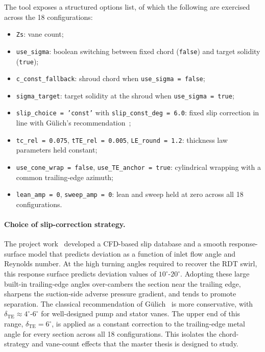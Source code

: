 The tool exposes a structured options list, of which the following are exercised across the 18 configurations:
\begin{itemize}
  \item \texttt{Zs}: vane count;
  \item \texttt{use\_sigma}: boolean switching between fixed chord (\texttt{false}) and target solidity (\texttt{true});
  \item \texttt{c\_const\_fallback}: shroud chord when \texttt{use\_sigma = false};
  \item \texttt{sigma\_target}: target solidity at the shroud when \texttt{use\_sigma = true};
  \item \texttt{slip\_choice = 'const'} with \texttt{slip\_const\_deg = 6.0}: fixed slip correction in line with G\"ulich's recommendation~\cite{Gulich2010};
  \item \texttt{tc\_rel = 0.075}, \texttt{tTE\_rel = 0.005}, \texttt{LE\_round = 1.2}: thickness law parameters held constant;
  \item \texttt{use\_cone\_wrap = false}, \texttt{use\_TE\_anchor = true}: cylindrical wrapping with a common trailing-edge azimuth;
  \item \texttt{lean\_amp = 0}, \texttt{sweep\_amp = 0}: lean and sweep held at zero across all 18 configurations.
\end{itemize}
 
\paragraph{Choice of slip-correction strategy.}
The project work~\cite{Leonsen2025} developed a CFD-based slip database and a smooth response-surface model that predicts deviation as a function of inlet flow angle and Reynolds number. At the high turning angles required to recover the RDT swirl, this response surface predicts deviation values of $10^\circ$-$20^\circ$. Adopting these large built-in trailing-edge angles over-cambers the section near the trailing edge, sharpens the suction-side adverse pressure gradient, and tends to promote separation. The classical recommendation of G\"ulich~\cite{Gulich2010} is more conservative, with $\delta_{\mathrm{TE}}\approx 4^\circ$-$6^\circ$ for well-designed pump and stator vanes. The upper end of this range, $\delta_{\mathrm{TE}} = 6^\circ$, is applied as a constant correction to the trailing-edge metal angle for every section across all 18 configurations. This isolates the chord-strategy and vane-count effects that the master thesis is designed to study.

